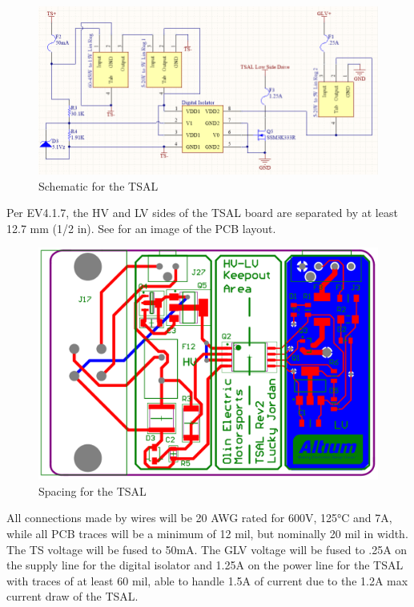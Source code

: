 \documentclass{article}
\begin{document}
\begin{figure}[H]
\centering
\includegraphics[scale=.7]{TSAL.png}
\caption{Schematic for the TSAL}
\label{fig:TSALcircuit}
\end{figure}

Per EV4.1.7, the HV and LV sides of the TSAL board are separated by at least 12.7 mm (1/2 in). See  for an image of the PCB layout.

\begin{figure}[H]
\centering
\includegraphics[scale=.7]{TSALspacing.png}
\caption{Spacing for the TSAL}
\label{fig:TSALspacing}
\end{figure}

All connections made by wires will be 20 AWG rated for 600V, 125°C and 7A, while all PCB traces will be a minimum of 12 mil, but nominally 20 mil in width. The TS voltage will be fused to 50mA. The GLV voltage will be fused to .25A on the supply line for the digital isolator and 1.25A on the power line for the TSAL with traces of at least 60 mil, able to handle 1.5A of current due to the 1.2A max current draw of the TSAL.
\end{document}

